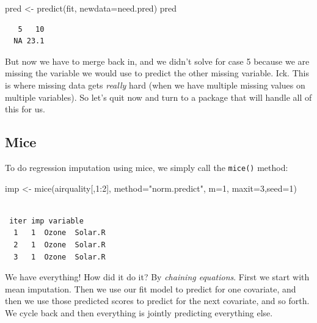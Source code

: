 \documentclass[
  letterpaper,
  DIV=11,
  numbers=noendperiod]{scrreprt}
\newenvironment{Shaded}{}{}
\newcommand{\AttributeTok}[1]{\textcolor[rgb]{0.49,0.56,0.16}{#1}}
\newcommand{\DecValTok}[1]{\textcolor[rgb]{0.25,0.63,0.44}{#1}}
\newcommand{\FunctionTok}[1]{\textcolor[rgb]{0.02,0.16,0.49}{#1}}
\newcommand{\NormalTok}[1]{#1}
\newcommand{\OtherTok}[1]{\textcolor[rgb]{0.00,0.44,0.13}{#1}}
\newcommand{\SpecialCharTok}[1]{\textcolor[rgb]{0.25,0.44,0.63}{#1}}
\newcommand{\StringTok}[1]{\textcolor[rgb]{0.25,0.44,0.63}{#1}}
\begin{document}
\begin{Shaded}
\begin{Highlighting}[]
\NormalTok{  pred }\OtherTok{\textless{}{-}} \FunctionTok{predict}\NormalTok{(fit, }\AttributeTok{newdata=}\NormalTok{need.pred)}
\NormalTok{  pred}
\end{Highlighting}
\end{Shaded}

\begin{verbatim}
   5   10 
  NA 23.1 
\end{verbatim}

But now we have to merge back in, and we didn't solve for case 5 because
we are missing the variable we would use to predict the other missing
variable. Ick. This is where missing data gets \emph{really} hard (when
we have multiple missing values on multiple variables). So let's quit
now and turn to a package that will handle all of this for us.

\subsection{Mice}\label{mice}

To do regression imputation using mice, we simply call the
\texttt{mice()} method:

\begin{Shaded}
\begin{Highlighting}[]
\NormalTok{  imp }\OtherTok{\textless{}{-}} \FunctionTok{mice}\NormalTok{(airquality[,}\DecValTok{1}\SpecialCharTok{:}\DecValTok{2}\NormalTok{], }\AttributeTok{method=}\StringTok{"norm.predict"}\NormalTok{, }\AttributeTok{m=}\DecValTok{1}\NormalTok{, }\AttributeTok{maxit=}\DecValTok{3}\NormalTok{,}\AttributeTok{seed=}\DecValTok{1}\NormalTok{)}
\end{Highlighting}
\end{Shaded}

\begin{verbatim}

 iter imp variable
  1   1  Ozone  Solar.R
  2   1  Ozone  Solar.R
  3   1  Ozone  Solar.R
\end{verbatim}

We have everything! How did it do it? By \emph{chaining equations}.
First we start with mean imputation. Then we use our fit model to
predict for one covariate, and then we use those predicted scores to
predict for the next covariate, and so forth. We cycle back and then
everything is jointly predicting everything else.
\end{document}
